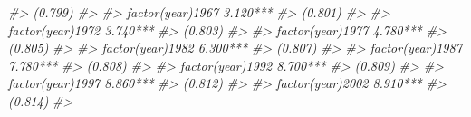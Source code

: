 \documentclass[]{book}
\newenvironment{Shaded}{\begin{snugshade}}{\end{snugshade}}
\newcommand{\CommentTok}[1]{\textcolor[rgb]{0.56,0.35,0.01}{\textit{#1}}}
\begin{document}
\begin{Shaded}
\begin{Highlighting}[]
\CommentTok{#>                                                          (0.799)                     }
\CommentTok{#>                                                                                      }
\CommentTok{#> factor(year)1967                                         3.120***                    }
\CommentTok{#>                                                          (0.801)                     }
\CommentTok{#>                                                                                      }
\CommentTok{#> factor(year)1972                                         3.740***                    }
\CommentTok{#>                                                          (0.803)                     }
\CommentTok{#>                                                                                      }
\CommentTok{#> factor(year)1977                                         4.780***                    }
\CommentTok{#>                                                          (0.805)                     }
\CommentTok{#>                                                                                      }
\CommentTok{#> factor(year)1982                                         6.300***                    }
\CommentTok{#>                                                          (0.807)                     }
\CommentTok{#>                                                                                      }
\CommentTok{#> factor(year)1987                                         7.780***                    }
\CommentTok{#>                                                          (0.808)                     }
\CommentTok{#>                                                                                      }
\CommentTok{#> factor(year)1992                                         8.700***                    }
\CommentTok{#>                                                          (0.809)                     }
\CommentTok{#>                                                                                      }
\CommentTok{#> factor(year)1997                                         8.860***                    }
\CommentTok{#>                                                          (0.812)                     }
\CommentTok{#>                                                                                      }
\CommentTok{#> factor(year)2002                                         8.910***                    }
\CommentTok{#>                                                          (0.814)                     }
\CommentTok{#>                                                                                      }

\end{Highlighting}
\end{Shaded}
\end{document}

